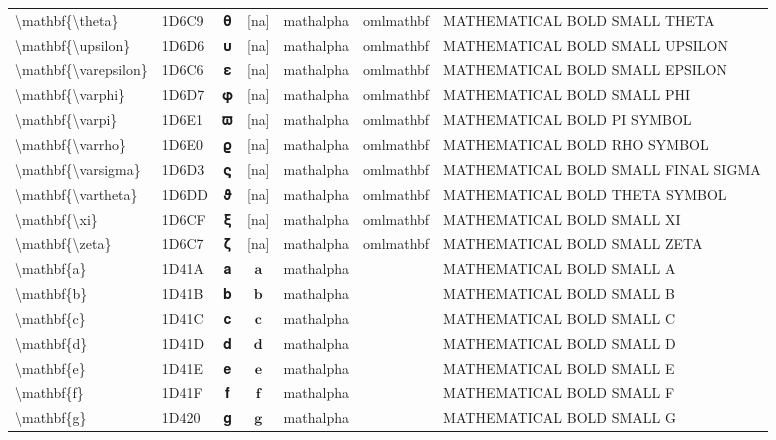 \documentclass[a4paper,landscape]{article}
\begin{document}
\begin{longtable}{llcclll}
\textbackslash{}mathbf\{\textbackslash{}theta\} & 1D6C9 & 𝛉 & [na] & mathalpha & omlmathbf & MATHEMATICAL BOLD SMALL THETA \\
\textbackslash{}mathbf\{\textbackslash{}upsilon\} & 1D6D6 & 𝛖 & [na] & mathalpha & omlmathbf & MATHEMATICAL BOLD SMALL UPSILON \\
\textbackslash{}mathbf\{\textbackslash{}varepsilon\} & 1D6C6 & 𝛆 & [na] & mathalpha & omlmathbf & MATHEMATICAL BOLD SMALL EPSILON \\
\textbackslash{}mathbf\{\textbackslash{}varphi\} & 1D6D7 & 𝛗 & [na] & mathalpha & omlmathbf & MATHEMATICAL BOLD SMALL PHI \\
\textbackslash{}mathbf\{\textbackslash{}varpi\} & 1D6E1 & 𝛡 & [na] & mathalpha & omlmathbf & MATHEMATICAL BOLD PI SYMBOL \\
\textbackslash{}mathbf\{\textbackslash{}varrho\} & 1D6E0 & 𝛠 & [na] & mathalpha & omlmathbf & MATHEMATICAL BOLD RHO SYMBOL \\
\textbackslash{}mathbf\{\textbackslash{}varsigma\} & 1D6D3 & 𝛓 & [na] & mathalpha & omlmathbf & MATHEMATICAL BOLD SMALL FINAL SIGMA \\
\textbackslash{}mathbf\{\textbackslash{}vartheta\} & 1D6DD & 𝛝 & [na] & mathalpha & omlmathbf & MATHEMATICAL BOLD THETA SYMBOL \\
\textbackslash{}mathbf\{\textbackslash{}xi\} & 1D6CF & 𝛏 & [na] & mathalpha & omlmathbf & MATHEMATICAL BOLD SMALL XI \\
\textbackslash{}mathbf\{\textbackslash{}zeta\} & 1D6C7 & 𝛇 & [na] & mathalpha & omlmathbf & MATHEMATICAL BOLD SMALL ZETA \\
\textbackslash{}mathbf\{a\} & 1D41A & 𝐚 & $\mathbf{a}$ & mathalpha &  & MATHEMATICAL BOLD SMALL A \\
\textbackslash{}mathbf\{b\} & 1D41B & 𝐛 & $\mathbf{b}$ & mathalpha &  & MATHEMATICAL BOLD SMALL B \\
\textbackslash{}mathbf\{c\} & 1D41C & 𝐜 & $\mathbf{c}$ & mathalpha &  & MATHEMATICAL BOLD SMALL C \\
\textbackslash{}mathbf\{d\} & 1D41D & 𝐝 & $\mathbf{d}$ & mathalpha &  & MATHEMATICAL BOLD SMALL D \\
\textbackslash{}mathbf\{e\} & 1D41E & 𝐞 & $\mathbf{e}$ & mathalpha &  & MATHEMATICAL BOLD SMALL E \\
\textbackslash{}mathbf\{f\} & 1D41F & 𝐟 & $\mathbf{f}$ & mathalpha &  & MATHEMATICAL BOLD SMALL F \\
\textbackslash{}mathbf\{g\} & 1D420 & 𝐠 & $\mathbf{g}$ & mathalpha &  & MATHEMATICAL BOLD SMALL G \\

\end{longtable}
\end{document}
